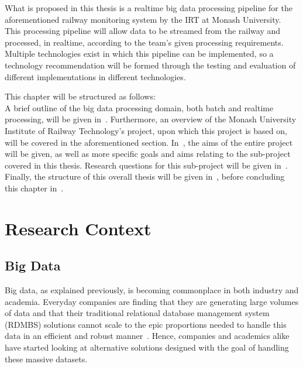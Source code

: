 What is proposed in this thesis is a realtime big data processing pipeline for the aforementioned railway monitoring
system by the IRT at Monash University. This processing pipeline will allow data to be
streamed from the railway and processed, in realtime, according to the team's given processing requirements. Multiple
technologies exist in which this pipeline can be implemented, so a technology recommendation will be formed through
the testing and evaluation of different implementations in different technologies.

This chapter will be structured as follows:\\
A brief outline of the big data processing domain, both batch and realtime processing, will be given
in~. Furthermore, an overview of the Monash University Institute of Railway Technology's
project, upon which this project is based on, will be covered in the aforementioned section. In~,
the aims of the entire project will be given, as well as more specific goals and aims relating to the sub-project
covered in this thesis. Research questions for this sub-project will be given in~.
Finally, the structure of this overall thesis will be given in~, before
concluding this chapter in~.




\section{Research Context} %
\label{sec:research_context}

\subsection{Big Data} %
\label{sub:big_data}

Big data, as explained previously, is becoming commonplace in both industry and academia. Everyday companies are finding
that they are generating large volumes of data and that their traditional relational database management system (RDMBS) solutions cannot
scale to the epic proportions needed to handle this data in an efficient and robust manner~\cite{marz2013principles}.
Hence, companies and academics alike have started looking at alternative solutions designed with the goal of handling
these massive datasets.

